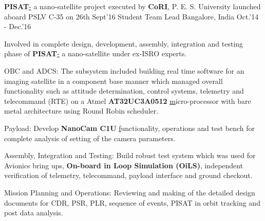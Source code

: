 \begin{cventries}
	\cventry
	{\textbf{PISAT}\href{http://pisat.pes.edu/}- a nano-satellite project executed by \textbf{CoRI}\href{http://cori.pes.edu/}, P. E. S. University launched aboard PSLV C-35 on 26th Sept'16}
	{Student Team Lead}
	{Bangalore, India}
	{Oct.'14 - Dec.'16}
	{
		\begin{cvitems}
		\item{Involved in complete design, development, assembly, integration and testing phase of \textbf{PISAT}\href{https://www.isro.gov.in/Spacecraft/pisat} - a nano-satellite under ex-ISRO experts.}
		\item{OBC and ADCS: The subsystem included building real time software for an imaging satellite in a component base manner which managed overall functionality such as attitude determination, control systems, telemetry and telecommand (RTE) on a Atmel \textbf{AT32UC3A0512 }\href{https://www.microchip.com/wwwproducts/en/AT32UC3A0512} micro-processor with bare metal architecture using Round Robin scheduler.}
		\item{Payload: Develop \textbf{NanoCam C1U }\href{https://gomspace.com/UserFiles/Subsystems/datasheet/gs-ds-nanocam-c1u-17.pdf} functionality, operations and test bench for complete analysis of setting of the camera parameters.}
		\item{Assembly, Integration and Testing: Build robust test system which was used for Avionics bring ups, \textbf{On-board in Loop Simulation (OiLS)}, independent verification of telemetry, telecommand, payload interface and ground checkout.}
		\item{Mission Planning and Operations: Reviewing and making of the detailed design documents for CDR, PSR, PLR, sequence of events, PISAT in orbit tracking and post data analysis.}
		\end{cvitems}
	}
\end{cventries}
